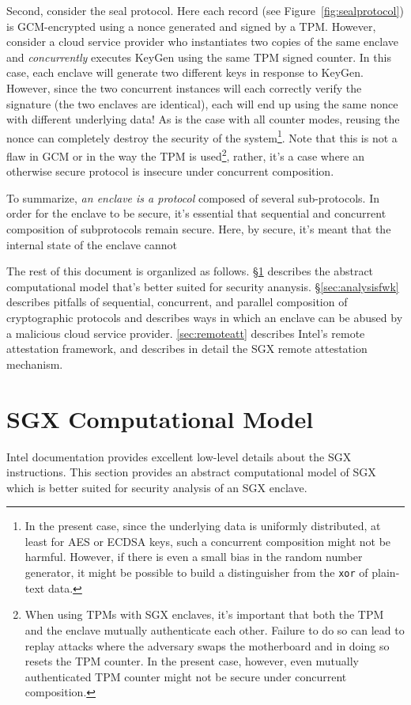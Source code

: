 \documentclass[10pt]{article}
\newcommand{\secref}[1]{\S\ref{#1}}
\begin{document}
  Second, consider the seal protocol. Here each record (see
  Figure~\ref{fig:sealprotocol}) is GCM-encrypted using a nonce
  generated and signed by a TPM. However, consider a cloud service
  provider who instantiates two copies of the same enclave and
  \textit{concurrently} executes \textsf{KeyGen} using the same TPM
  signed counter. In this case, each enclave will generate two
  different keys in response to \textsf{KeyGen}. However, since the
  two concurrent instances will each correctly verify the signature
  (the two enclaves are identical), each will end up using the same
  nonce with different underlying data! As is the case with all
  counter modes, reusing the nonce can completely destroy the security
  of the system\footnote{In the present case, since the underlying
    data is uniformly distributed, at least for AES or ECDSA keys,
    such a concurrent composition might not be harmful. However, if
    there is even a small bias in the random number generator, it
    might be possible to build a distinguisher from the \texttt{xor}
    of plain-text data.}. Note that this is not a flaw in GCM or in
  the way the TPM is used\footnote{When using TPMs with SGX enclaves,
    it's important that both the TPM and the enclave mutually
    authenticate each other. Failure to do so can lead to replay
    attacks where the adversary swaps the motherboard and in doing so
    resets the TPM counter. In the present case, however, even
    mutually authenticated TPM counter might not be secure under
    concurrent composition.}, rather, it's a case where an otherwise
  secure protocol is insecure under concurrent composition.

  To summarize, \textit{an enclave is a protocol} composed of several
  sub-protocols. In order for the enclave to be secure, it's essential
  that sequential and concurrent composition of subprotocols remain
  secure. Here, by secure, it's meant that the internal state of the
  enclave cannot

  The rest of this document is organlized as follows.
  \secref{sec:model} describes the abstract computational model that's
  better suited for security ananysis. \secref{sec:analysisfwk}
  describes pitfalls of sequential, concurrent, and parallel
  composition of cryptographic protocols and describes ways in which
  an enclave can be abused by a malicious cloud service
  provider. \ref{sec:remoteatt} describes Intel's remote attestation
  framework, and describes in detail the SGX remote attestation
  mechanism.

  \section{SGX Computational Model}
  \label{sec:model}
  Intel documentation\cite{intelsdm} provides excellent low-level
  details about the SGX instructions. This section provides an
  abstract computational model of SGX which is better suited for
  security analysis of an SGX enclave.
\end{document}
